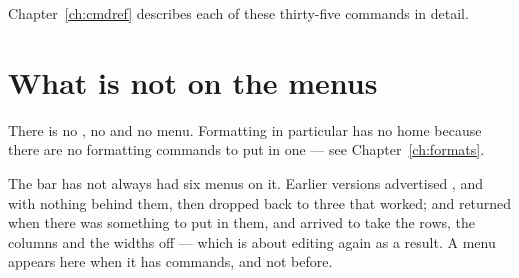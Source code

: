 \begin{ccfigure}
\caption{Every command on every menu}
\label{fig:menumap}
\end{ccfigure}

Chapter~\ref{ch:cmdref} describes each of these thirty-five commands in detail.

\section{What is not on the menus}

There is no , no  and no  menu.
Formatting in particular has no home because there are no formatting commands to
put in one --- see Chapter~\ref{ch:formats}.

\begin{ccnote}
The bar has not always had six menus on it. Earlier versions advertised
,  and  with nothing behind them,
then dropped back to three that worked;  and 
returned when there was something to put in them, and  arrived
to take the rows, the columns and the widths off  --- which is
about editing again as a result. A menu appears here when it has commands, and
not before.
\end{ccnote}
